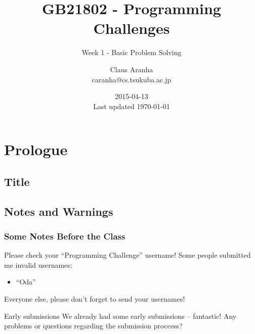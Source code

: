 \documentclass{beamer}
\title[GB21802]{GB21802 - Programming Challenges}
\subtitle[]{Week 1 - Basic Problem Solving}
\author[Claus Aranha]{Claus Aranha\\{\footnotesize caranha@cs.tsukuba.ac.jp}}
\institute{College of Information Science}
\date{2015-04-13\\{\tiny Last updated \today}}
\begin{document}
\section{Prologue}
\subsection{Title}
\begin{frame}
\maketitle
\end{frame}

\subsection{Notes and Warnings}

\begin{frame}
  \frametitle{Some Notes Before the Class}
  \begin{exampleblock}{Please check your ``Programming Challenge'' username!}
    Some people submitted me invalid usernames:
    \begin{itemize}
    \item ``Oda''
    \end{itemize}
    Everyone else, please don't forget to send your usernames!
  \end{exampleblock}
  \vfill
  \begin{exampleblock}{Early submissions}
    We already had some early submissions -- fantastic!
    \medskip
    Any problems or questions regarding the submission proccess?
  \end{exampleblock}
\end{frame}
\end{document}
